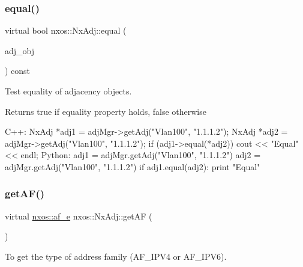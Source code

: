 \subsubsection{\texorpdfstring{equal()}{equal()}}
{\footnotesize\ttfamily virtual bool nxos\+::\+Nx\+Adj\+::equal (\begin{DoxyParamCaption}\item[{\mbox{\hyperlink{classnxos_1_1_nx_adj}{Nx\+Adj}} const \&}]{adj\+\_\+obj }\end{DoxyParamCaption}) const\hspace{0.3cm}{\ttfamily [pure virtual]}}

Test equality of adjacency objects.

\begin{DoxyReturn}{Returns}
true if equality property holds, false otherwise
\end{DoxyReturn}

\begin{DoxyCode}
C++:
    NxAdj *adj1 = adjMgr->getAdj(\textcolor{stringliteral}{"Vlan100"}, \textcolor{stringliteral}{"1.1.1.2"});
    NxAdj *adj2 = adjMgr->getAdj(\textcolor{stringliteral}{"Vlan100"}, \textcolor{stringliteral}{"1.1.1.2"});
    \textcolor{keywordflow}{if} (adj1->equal(*adj2))
        cout << \textcolor{stringliteral}{"Equal"} << endl;
Python:
    adj1 = adjMgr.getAdj(\textcolor{stringliteral}{"Vlan100"}, \textcolor{stringliteral}{"1.1.1.2"})
    adj2 = adjMgr.getAdj(\textcolor{stringliteral}{"Vlan100"}, \textcolor{stringliteral}{"1.1.1.2"})
    \textcolor{keywordflow}{if} adj1.equal(adj2):
         print \textcolor{stringliteral}{"Equal"}
\end{DoxyCode}
 \mbox{\label{classnxos_1_1_nx_adj_a5e026c5187f3a88337790ad5d7cb4e5b}} 
\subsubsection{\texorpdfstring{get\+A\+F()}{getAF()}}
{\footnotesize\ttfamily virtual \mbox{\hyperlink{namespacenxos_a3a667f48b94db10aa398940dc5bf72d7}{nxos\+::af\+\_\+e}} nxos\+::\+Nx\+Adj\+::get\+AF (\begin{DoxyParamCaption}{ }\end{DoxyParamCaption})\hspace{0.3cm}{\ttfamily [pure virtual]}}

To get the type of address family (A\+F\+\_\+\+I\+P\+V4 or A\+F\+\_\+\+I\+P\+V6).

